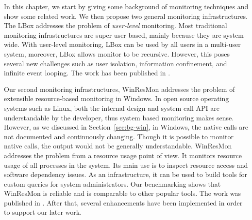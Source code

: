 In this chapter, we start by giving some background of monitoring techniques
and show some related work.
We then propose two general monitoring infrastructures.
The LBox addresses the problem of {\em user-level} monitoring.
Most traditional monitoring infrastructures are super-user based,
mainly because they are system-wide.
With user-level monitoring, LBox can be used by all users in a multi-user
system, moreover, LBox allows monitor to be recursive.
However, this poses several new challenges such as
user isolation, information confinement, and infinite event looping.
The work has been published in \cite{wu2005user}.

Our second monitoring infrastructures, WinResMon addresses the problem
of extensible resource-based monitoring in Windows.
In open source operating systems such as Linux,
both the internal design and system call API are understandable by
the developer, thus system based monitoring makes sense.
However, as we discussed in Section~\ref{sec:bg-win},
in Windows, the native calls are not documented and continuously
changing.
Though it is possible to monitor native calls, the output would not be
generally understandable.
WinResMon addresses the problem from a resource usage point of view.
It monitors resource usage of all processes in the system.
Its main use is to inspect resource access and software dependency issues.
As an infrastructure, it can be used to build tools for custom queries
for system administrators.
Our benchmarking shows that WinResMon is reliable and is
comparable to other popular tools.
The work was published in \cite{ramnath2006winresmon}.
After that, several enhancements have been implemented in order to support
our later work.
